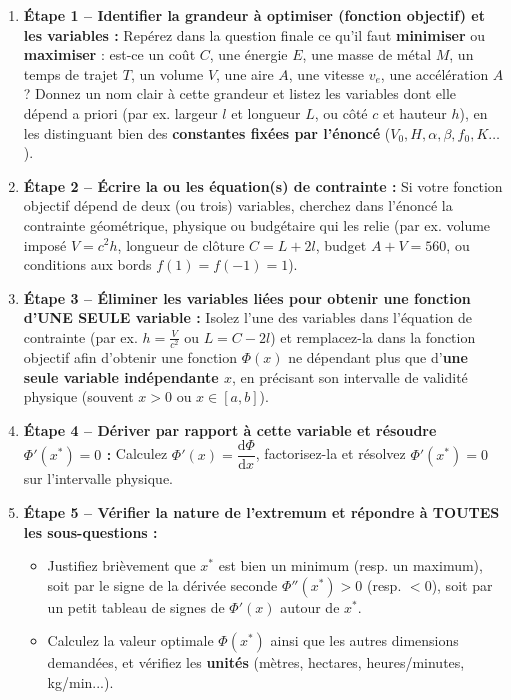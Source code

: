 \begin{theoreme}
\begin{enumerate}
    \item \textbf{Étape 1 -- Identifier la grandeur à optimiser (fonction objectif) et les variables :}
    Repérez dans la question finale ce qu'il faut \textbf{minimiser} ou \textbf{maximiser} : est-ce un coût $C$, une énergie $E$, une masse de métal $M$, un temps de trajet $T$, un volume $V$, une aire $A$, une vitesse $v_e$, une accélération $A$ ? Donnez un nom clair à cette grandeur et listez les variables dont elle dépend a priori (par ex. largeur $l$ et longueur $L$, ou côté $c$ et hauteur $h$), en les distinguant bien des \textbf{constantes fixées par l'énoncé} ($V_0, H, \alpha, \beta, f_0, K\dots$).
    \item \textbf{Étape 2 -- Écrire la ou les équation(s) de contrainte :}
    Si votre fonction objectif dépend de deux (ou trois) variables, cherchez dans l'énoncé la contrainte géométrique, physique ou budgétaire qui les relie (par ex. volume imposé $V = c^2 h$, longueur de clôture $C = L + 2l$, budget $A + V = 560$, ou conditions aux bords $f(1) = f(-1) = 1$).
    \item \textbf{Étape 3 -- Éliminer les variables liées pour obtenir une fonction d'UNE SEULE variable :}
    Isolez l'une des variables dans l'équation de contrainte (par ex. $h = \frac{V}{c^2}$ ou $L = C - 2l$) et remplacez-la dans la fonction objectif afin d'obtenir une fonction $\Phi(x)$ ne dépendant plus que d'\textbf{une seule variable indépendante $x$}, en précisant son intervalle de validité physique (souvent $x > 0$ ou $x \in [a, b]$).
    \item \textbf{Étape 4 -- Dériver par rapport à cette variable et résoudre $\Phi'(x^*) = 0$ :}
    Calculez $\Phi'(x) = \dfrac{\mathrm{d}\Phi}{\mathrm{d}x}$, factorisez-la et résolvez $\Phi'(x^*) = 0$ sur l'intervalle physique.
    \item \textbf{Étape 5 -- Vérifier la nature de l'extremum et répondre à TOUTES les sous-questions :}
    \begin{itemize}
        \item Justifiez brièvement que $x^*$ est bien un minimum (resp. un maximum), soit par le signe de la dérivée seconde $\Phi''(x^*) > 0$ (resp. $< 0$), soit par un petit tableau de signes de $\Phi'(x)$ autour de $x^*$.
        \item Calculez la valeur optimale $\Phi(x^*)$ ainsi que les autres dimensions demandées, et vérifiez les \textbf{unités} (mètres, hectares, heures/minutes, kg/min...).
    \end{itemize}
\end{enumerate}
\end{theoreme}


